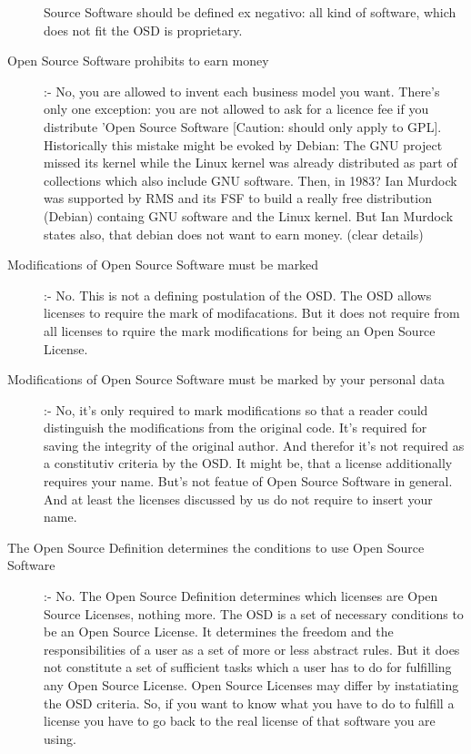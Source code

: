 \begin{description}
  Source Software should be defined ex negativo: all kind of software, which
  does not fit the OSD is proprietary.
  \item[Open Source Software prohibits to earn money] :- No,
  you are allowed to invent each business model you want. There's only one
  exception: you are not allowed to ask for a licence fee if you distribute
  'Open Source Software [Caution: should only apply to GPL].
  Historically this mistake might be evoked by Debian: The GNU project missed
  its kernel while the Linux kernel was already distributed as part of
  collections which also include GNU software. Then, in 1983? Ian Murdock was
  supported by RMS and its FSF to build a really free distribution (Debian)
  containg GNU software and the Linux kernel. But Ian Murdock states also, that
  debian does not want to earn money. (clear details)
  \item[Modifications of Open Source Software must be marked] :- No. This is not
  a defining postulation of the OSD. The OSD allows licenses to require the mark
  of modifacations. But it does not require from all licenses to rquire the mark
  modifications for being an Open Source License.
  \item[Modifications of Open Source Software must be marked by your personal
  data] :- No, it's only required to mark modifications so that a reader could
  distinguish the modifications from the original code. It's required for saving
  the integrity of the original author. And therefor it's not required as a
  constitutiv criteria by the OSD. It might be, that a license additionally
  requires your name. But's not featue of Open Source Software in general. And
  at least the licenses discussed by us do not require to insert your name.
  \item[The Open Source Definition determines the conditions to use Open Source
  Software] :- No. The Open Source Definition determines which licenses are Open
  Source Licenses, nothing more. The OSD is a set of necessary conditions to be
  an Open Source License. It determines the freedom and the responsibilities of
  a user as a set of more or less abstract rules. But it does not constitute a
  set of sufficient tasks which a user has to do for fulfilling any Open Source
  License. Open Source Licenses may differ by instatiating the OSD criteria.
  So, if you want to know what you have to do to fulfill a license you have to
  go back to the real license of that software you are using.
\end{description}

%
